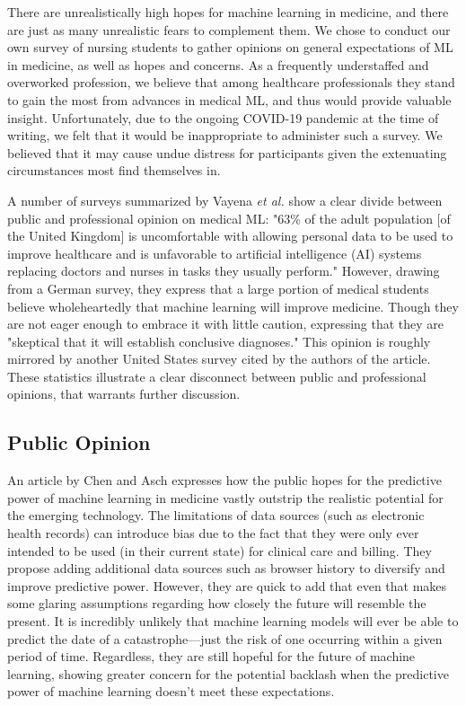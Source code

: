 \documentclass[]{article}
\begin{document}
		There are unrealistically high hopes for machine learning in medicine\cite{Chen2017,10.1001/jama.2017.18391}, and there are just as many unrealistic fears to complement them\cite{bbc2016rroai}. We chose to conduct our own survey of nursing students to gather opinions on general expectations of ML in medicine, as well as hopes and concerns. As a frequently understaffed and overworked profession\cite{doi:10.1111/j.1365-2648.2009.05082.x}, we believe that among healthcare professionals they stand to gain the most from advances in medical ML, and thus would provide valuable insight. Unfortunately, due to the ongoing COVID-19 pandemic at the time of writing, we felt that it would be inappropriate to administer such a survey. We believed that it may cause undue distress for participants given the extenuating circumstances most find themselves in.

		A number of surveys summarized by Vayena \emph{et al.} show a clear divide between public and professional opinion on medical ML: "63\% of the adult population [of the United Kingdom] is uncomfortable with allowing personal data to be used to improve healthcare and is unfavorable to artificial intelligence (AI) systems replacing doctors and nurses in tasks they usually perform." However, drawing from a German survey, they express that a large portion of medical students believe wholeheartedly that machine learning will improve medicine. Though they are not eager enough to embrace it with little caution, expressing that they are "skeptical that it will establish conclusive diagnoses."\cite{Vayena2018} This opinion is roughly mirrored by another United States survey cited by the authors of the article.\cite{PintodosSantos2019} These statistics illustrate a clear disconnect between public and professional opinions, that warrants further discussion.

		\subsection{Public Opinion}

			An article by Chen and Asch expresses how the public hopes for the predictive power of machine learning in medicine vastly outstrip the realistic potential for the emerging technology. The limitations of data sources (such as electronic health records) can introduce bias\cite{Gianfrancesco2018} due to the fact that they were only ever intended to be used (in their current state) for clinical care and billing. They propose adding additional data sources such as browser history to diversify and improve predictive power. However, they are quick to add that even that makes some glaring assumptions regarding how closely the future will resemble the present. It is incredibly unlikely that machine learning models will ever be able to predict the date of a catastrophe---just the risk of one occurring within a given period of time. Regardless, they are still hopeful for the future of machine learning, showing greater concern for the potential backlash when the predictive power of machine learning doesn't meet these expectations.\cite{Chen2017}
\end{document}
